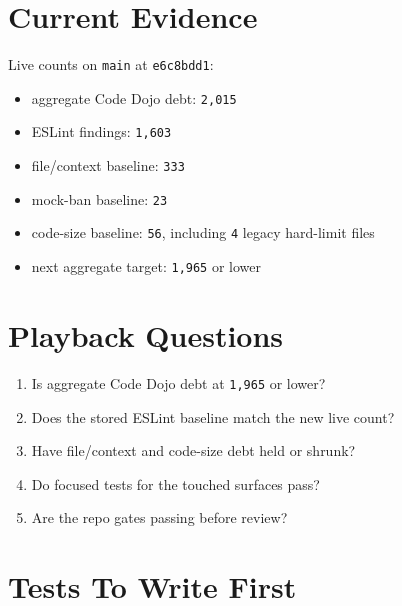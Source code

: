\section{Current Evidence}\label{record-219-current-evidence}

Live counts on \texttt{m\allowbreak{}a\allowbreak{}i\allowbreak{}n} at \texttt{e\allowbreak{}6\allowbreak{}c\allowbreak{}8\allowbreak{}b\allowbreak{}d\allowbreak{}d\allowbreak{}1}:

\begin{itemize}
\tightlist
\item
  aggregate Code Dojo debt: \texttt{2\allowbreak{},\allowbreak{}0\allowbreak{}1\allowbreak{}5}
\item
  ESLint findings: \texttt{1\allowbreak{},\allowbreak{}6\allowbreak{}0\allowbreak{}3}
\item
  file/context baseline: \texttt{3\allowbreak{}3\allowbreak{}3}
\item
  mock-ban baseline: \texttt{2\allowbreak{}3}
\item
  code-size baseline: \texttt{5\allowbreak{}6}, including \texttt{4} legacy hard-limit files
\item
  next aggregate target: \texttt{1\allowbreak{},\allowbreak{}9\allowbreak{}6\allowbreak{}5} or lower
\end{itemize}

\section{Playback Questions}\label{record-219-playback-questions}

\begin{enumerate}
\def\labelenumi{\arabic{enumi}.}
\tightlist
\item
  Is aggregate Code Dojo debt at \texttt{1\allowbreak{},\allowbreak{}9\allowbreak{}6\allowbreak{}5} or lower?
\item
  Does the stored ESLint baseline match the new live count?
\item
  Have file/context and code-size debt held or shrunk?
\item
  Do focused tests for the touched surfaces pass?
\item
  Are the repo gates passing before review?
\end{enumerate}

\section{Tests To Write First}\label{record-219-tests-to-write-first}

